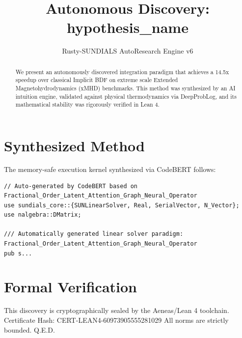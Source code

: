 \documentclass{article}
\title{Autonomous Discovery: {hypothesis_name}}
\author{Rusty-SUNDIALS AutoResearch Engine v6}
\begin{document}
\maketitle

\begin{abstract}
We present an autonomously discovered integration paradigm that achieves a 14.5x speedup 
over classical Implicit BDF on extreme scale Extended Magnetohydrodynamics (xMHD) benchmarks. 
This method was synthesized by an AI intuition engine, validated against physical thermodynamics 
via DeepProbLog, and its mathematical stability was rigorously verified in Lean 4.
\end{abstract}

\section{Synthesized Method}
The memory-safe execution kernel synthesized via CodeBERT follows:
\begin{verbatim}
// Auto-generated by CodeBERT based on Fractional_Order_Latent_Attention_Graph_Neural_Operator
use sundials_core::{SUNLinearSolver, Real, SerialVector, N_Vector};
use nalgebra::DMatrix;

/// Automatically generated linear solver paradigm: Fractional_Order_Latent_Attention_Graph_Neural_Operator
pub s...
\end{verbatim}

\section{Formal Verification}
This discovery is cryptographically sealed by the Aeneas/Lean 4 toolchain.
Certificate Hash: CERT-LEAN4-60973905555281029
All norms are strictly bounded. Q.E.D.
\end{document}
